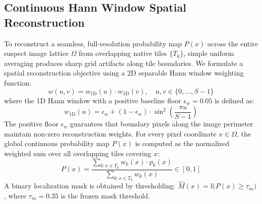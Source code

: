 \documentclass[sigconf,review=true]{acmart}
\begin{document}
\subsection{Continuous Hann Window Spatial Reconstruction}
To reconstruct a seamless, full-resolution probability map $P(x)$ across the entire suspect image lattice $\Omega$ from overlapping native tiles $\{T_k\}$, simple uniform averaging produces sharp grid artifacts along tile boundaries. We formulate a spatial reconstruction objective using a 2D separable Hann window weighting function:
\begin{equation}
    w(u, v) = w_{\mathrm{1D}}(u) \cdot w_{\mathrm{1D}}(v), \quad u, v \in \{0, \dots, S-1\}
\end{equation}
where the 1D Hann window with a positive baseline floor $\epsilon_w = 0.05$ is defined as:
\begin{equation}
    w_{\mathrm{1D}}(u) = \epsilon_w + (1 - \epsilon_w) \cdot \sin^2\left(\frac{\pi u}{S - 1}\right)
    \label{eq:hann_blend}
\end{equation}
The positive floor $\epsilon_w$ guarantees that boundary pixels along the image perimeter maintain non-zero reconstruction weights. For every pixel coordinate $x \in \Omega$, the global continuous probability map $P(x)$ is computed as the normalized weighted sum over all overlapping tiles covering $x$:
\begin{equation}
    P(x) = \frac{\sum_{k: x \in T_k} w_k(x) \cdot p_k(x)}{\sum_{k: x \in T_k} w_k(x)} \in [0, 1]
    \label{eq:full_map_recon}
\end{equation}
A binary localization mask is obtained by thresholding: $\hat{M}(x) = \mathbb{I}\big(P(x) \geq \tau_m\big)$, where $\tau_m = 0.35$ is the frozen mask threshold.
\end{document}
